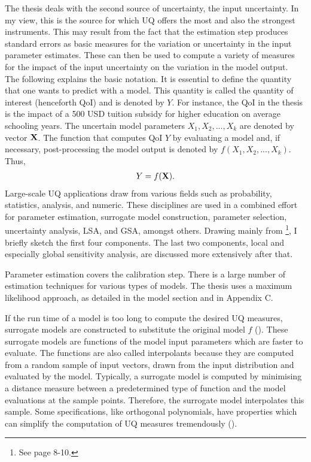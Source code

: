 \documentclass[a4paper,12pt]{article}
\begin{document}
The thesis deals with the second source of uncertainty, the input uncertainty. In my view, this is the source for which UQ offers the most and also the strongest instruments. This may result from the fact that the estimation step produces standard errors as basic measures for the variation or uncertainty in the input parameter estimates. These can then be used to compute a variety of measures for the impact of the input uncertainty on the variation in the model output.\\
\newline
The following explains the basic notation. It is essential to define the quantity that one wants to predict with a model. This quantity is called the quantity of interest (henceforth QoI) and is denoted by $Y$. For instance, the QoI in the thesis is the impact of a 500 USD tuition subsidy for higher education on average schooling years. The uncertain model parameters $X_1, X_2, ..., X_k$ are denoted by vector $\bold{X}$. The function that computes QoI $Y$ by evaluating a  model and, if necessary, post-processing the model output is denoted by $f(X_1, X_2, ..., X_k)$. Thus,
\begin{align}
Y = f(\bold{X}).
\end{align}
Large-scale UQ applications draw from various fields such as probability, statistics, analysis, and numeric. These disciplines are used in a combined effort for parameter estimation, surrogate model construction, parameter selection, uncertainty analysis, LSA, and GSA, amongst others. Drawing mainly from \cite{Smith.2014}\footnote{See page 8-10.}, I briefly sketch the first four components. The last two components, local and especially global sensitivity analysis, are discussed more extensively after that.

Parameter estimation covers the calibration step. There is a large number of estimation techniques for various types of models. The thesis uses a maximum likelihood approach, as detailed in the model section and in Appendix C.

If the run time of a model is too long to compute the desired UQ measures, surrogate models are constructed to substitute the original model $f$ (\cite{mcbride2019overview}). These surrogate models are functions of the model input parameters which are faster to evaluate. The functions are also called interpolants because they are computed from a random sample of input vectors, drawn from the input distribution and evaluated by the model. Typically, a surrogate model is computed by minimising a distance measure between a predetermined type of function and the model evaluations at the sample points. Therefore, the surrogate model interpolates this sample. Some specifications, like orthogonal polynomials, have properties which can simplify the computation of UQ measures tremendously (\cite{xiu2010numerical}).
\end{document}
